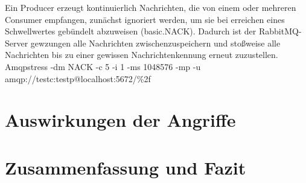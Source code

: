 \documentclass[	a4paper,
			11pt,
			titlepage,
			oneside,
			fleqn,
			listof=totoc,
			parskip,
			chapterprefix=false,
			numbers=noenddot]{scrreprt}
\begin{document}
		{Ein Producer erzeugt kontinuierlich Nachrichten, die von einem oder mehreren Consumer empfangen, zunächst ignoriert werden, um sie bei erreichen eines Schwellwertes gebündelt abzuweisen (basic.NACK). Dadurch ist der RabbitMQ-Server gewzungen alle Nachrichten zwischenzuspeichern und stoßweise alle Nachrichten bis zu einer gewissen Nachrichtenkennung erneut zuzustellen.}%
		{}%
		{Amqpstress -dm NACK -c 5 -i 1 -ms 1048576 -mp -u amqp://testc:testp@localhost:5672/\%2f}%
		{}
	
	\clearpage
	\section*{Auswirkungen der Angriffe}
	
	
	
	\clearpage
	\section*{Zusammenfassung und Fazit}
\end{document}
